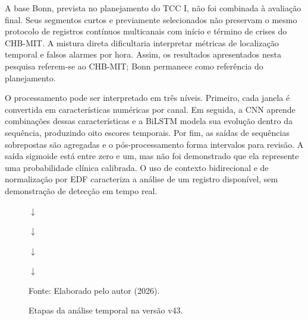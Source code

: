 \endgroup
{}

A base Bonn, prevista no planejamento do TCC I, não foi combinada à avaliação final. Seus segmentos curtos e previamente selecionados não preservam o mesmo protocolo de registros contínuos multicanais com início e término de crises do CHB-MIT. A mistura direta dificultaria interpretar métricas de localização temporal e falsos alarmes por hora. Assim, os resultados apresentados nesta pesquisa referem-se ao CHB-MIT; Bonn permanece como referência do planejamento.

O processamento pode ser interpretado em três níveis. Primeiro, cada janela é convertida em características numéricas por canal. Em seguida, a CNN aprende combinações dessas características e a BiLSTM modela sua evolução dentro da sequência, produzindo oito escores temporais. Por fim, as saídas de sequências sobrepostas são agregadas e o pós-processamento forma intervalos para revisão. A saída sigmoide está entre zero e um, mas não foi demonstrado que ela represente uma probabilidade clínica calibrada. O uso de contexto bidirecional e de normalização por EDF caracteriza a análise de um registro disponível, sem demonstração de detecção em tempo real.

\begin{figure}[htbp]
\centering
\caption{Etapas da análise temporal na versão v43.}\label{fig:fluxo-v43}
\begin{minipage}{0.91\textwidth}
\centering\small
{}\par
$\downarrow$\par
{}\par
$\downarrow$\par
{}\par
$\downarrow$\par
{}\par
$\downarrow$\par
{}
\end{minipage}\par
{\fontsize{10}{12}\selectfont Fonte: Elaborado pelo autor (2026).\par}
\end{figure}


